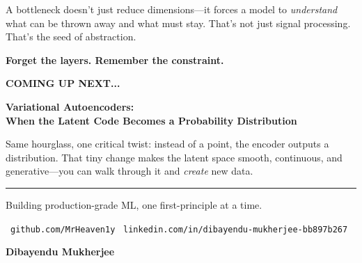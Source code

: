 \documentclass[11pt]{article}
\begin{document}
A bottleneck doesn't just reduce dimensions—it forces a model to \textit{understand} what can be thrown away and what must stay. That's not just signal processing. That's the seed of abstraction.

\vspace{0.8in}

\begin{center}
{\Large\color{brandnavy}\textbf{Forget the layers. Remember the constraint.}}
\end{center}

\newpage

\thispagestyle{empty}
\vspace*{0.5in} 
\begin{center}
    {\fontsize{14}{16}\selectfont\color{brandblue}\textbf{COMING UP NEXT...}}
    
    \vspace{0.2in} 
    
    {\fontsize{32}{38}\selectfont\color{brandnavy}\bfseries Variational Autoencoders:\\When the Latent Code Becomes a Probability Distribution}
    
    \vspace{0.2in} 
    
    \begin{minipage}{0.7\textwidth}
        \centering
        \color{brandgray}\fontsize{14}{18}\selectfont
        Same hourglass, one critical twist: instead of a point, the encoder outputs a distribution. That tiny change makes the latent space smooth, continuous, and generative—you can walk through it and \textit{create} new data.
    \end{minipage}
\end{center}

\vfill
\vspace{0.1in}
\begin{center}
    \rule{0.6\textwidth}{0.5pt}

    \vspace{0.18in}
    
    {\fontsize{11}{13}\selectfont\color{brandgray}
    Building production-grade ML, one first-principle at a time.
    }

    \vspace{0.18in}

    {\fontsize{10}{12}\selectfont\color{brandgray}
    \faGithub\ \texttt{github.com/MrHeaven1y}
    \hspace{0.45in}
    \faLinkedin\ \texttt{linkedin.com/in/dibayendu-mukherjee-bb897b267}
    }

    \vspace{0.15in}

    {\fontsize{14}{16}\selectfont\color{brandnavy}\textbf{Dibayendu Mukherjee}}

\end{center}

\vspace*{0.3in} 
\end{document}
